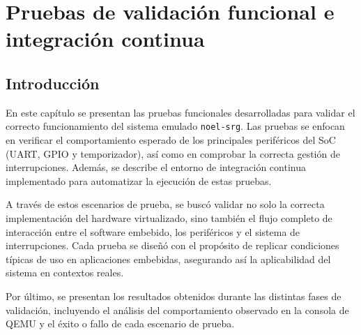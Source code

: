 %
%
%
% 
%
%
%
%

\chapter{Pruebas de validación funcional e integración continua}
\label{cha:pruebas-validacion}


\section{Introducción}
\label{sec:introduccion-pruebas}

En este capítulo se presentan las pruebas funcionales desarrolladas para validar el correcto funcionamiento del sistema emulado \texttt{noel-srg}. Las pruebas se enfocan en verificar el comportamiento esperado de los principales periféricos del SoC (UART, GPIO y temporizador), así como en comprobar la correcta gestión de interrupciones. Además, se describe el entorno de integración continua implementado para automatizar la ejecución de estas pruebas.

A través de estos escenarios de prueba, se buscó validar no solo la correcta implementación del hardware virtualizado, sino también el flujo completo de interacción entre el software embebido, los periféricos y el sistema de interrupciones. Cada prueba se diseñó con el propósito de replicar condiciones típicas de uso en aplicaciones embebidas, asegurando así la aplicabilidad del sistema en contextos reales.

Por último, se presentan los resultados obtenidos durante las distintas fases de validación, incluyendo el análisis del comportamiento observado en la consola de QEMU y el éxito o fallo de cada escenario de prueba.

